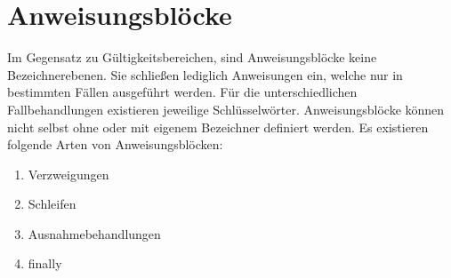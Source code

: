 \chapter{Anweisungsblöcke}
Im Gegensatz zu Gültigkeitsbereichen, sind Anweisungsblöcke keine Bezeichnerebenen. Sie schließen lediglich Anweisungen ein, welche nur in bestimmten
Fällen ausgeführt werden.
Für die unterschiedlichen Fallbehandlungen existieren jeweilige Schlüsselwörter.
Anweisungsblöcke können nicht selbst ohne oder mit eigenem Bezeichner definiert werden.
Es existieren folgende Arten von Anweisungsblöcken:
\begin{enumerate}
\item Verzweigungen
\item Schleifen
\item Ausnahmebehandlungen
\item finally
\end{enumerate}